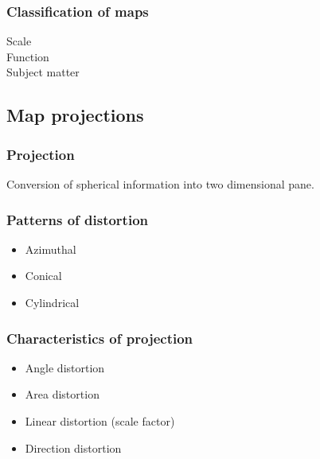 \documentclass[17pt]{beamer}
\begin{document}
\begin{frame}
  \frametitle{Classification of maps}
  \begin{description}
  \item[Scale] 
  \item[Function] 
  \item[Subject matter] 
  \end{description}
\end{frame}


\subsection{Map projections}

\begin{frame}
  \frametitle{Projection}
  Conversion of spherical information into two dimensional pane.
\end{frame}


\begin{frame}
  \frametitle{Patterns of distortion}
  \begin{itemize}
  \item Azimuthal
  \item Conical
  \item Cylindrical
  \end{itemize}
\end{frame}

\begin{frame}
  \frametitle{Characteristics of projection}
  \begin{itemize}
  \item Angle distortion
  \item Area distortion
  \item Linear distortion (scale factor)
  \item Direction distortion
  \end{itemize}
\end{frame}
\end{document}
